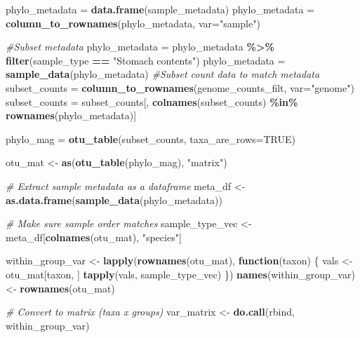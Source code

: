 \documentclass[
]{book}
\newenvironment{Shaded}{\begin{snugshade}}{\end{snugshade}}
\newcommand{\AttributeTok}[1]{\textcolor[rgb]{0.13,0.29,0.53}{#1}}
\newcommand{\CommentTok}[1]{\textcolor[rgb]{0.56,0.35,0.01}{\textit{#1}}}
\newcommand{\ConstantTok}[1]{\textcolor[rgb]{0.56,0.35,0.01}{#1}}
\newcommand{\ControlFlowTok}[1]{\textcolor[rgb]{0.13,0.29,0.53}{\textbf{#1}}}
\newcommand{\FunctionTok}[1]{\textcolor[rgb]{0.13,0.29,0.53}{\textbf{#1}}}
\newcommand{\NormalTok}[1]{#1}
\newcommand{\OtherTok}[1]{\textcolor[rgb]{0.56,0.35,0.01}{#1}}
\newcommand{\SpecialCharTok}[1]{\textcolor[rgb]{0.81,0.36,0.00}{\textbf{#1}}}
\newcommand{\StringTok}[1]{\textcolor[rgb]{0.31,0.60,0.02}{#1}}
\begin{document}
\begin{Shaded}
\begin{Highlighting}[]
\NormalTok{phylo\_metadata }\OtherTok{=} \FunctionTok{data.frame}\NormalTok{(sample\_metadata)}
\NormalTok{phylo\_metadata }\OtherTok{=} \FunctionTok{column\_to\_rownames}\NormalTok{(phylo\_metadata, }\AttributeTok{var=}\StringTok{"sample"}\NormalTok{)}

\CommentTok{\#Subset metadata}
\NormalTok{phylo\_metadata }\OtherTok{=}\NormalTok{ phylo\_metadata }\SpecialCharTok{\%\textgreater{}\%} \FunctionTok{filter}\NormalTok{(sample\_type }\SpecialCharTok{==} \StringTok{"Stomach contents"}\NormalTok{)}
\NormalTok{phylo\_metadata }\OtherTok{=} \FunctionTok{sample\_data}\NormalTok{(phylo\_metadata)}
\CommentTok{\#Subset count data to match metadata}
\NormalTok{subset\_counts }\OtherTok{=} \FunctionTok{column\_to\_rownames}\NormalTok{(genome\_counts\_filt, }\AttributeTok{var=}\StringTok{"genome"}\NormalTok{)}
\NormalTok{subset\_counts }\OtherTok{=}\NormalTok{ subset\_counts[, }\FunctionTok{colnames}\NormalTok{(subset\_counts) }\SpecialCharTok{\%in\%} \FunctionTok{rownames}\NormalTok{(phylo\_metadata)]}

\NormalTok{phylo\_mag }\OtherTok{=} \FunctionTok{otu\_table}\NormalTok{(subset\_counts, }\AttributeTok{taxa\_are\_rows=}\ConstantTok{TRUE}\NormalTok{)}

\NormalTok{otu\_mat }\OtherTok{\textless{}{-}} \FunctionTok{as}\NormalTok{(}\FunctionTok{otu\_table}\NormalTok{(phylo\_mag), }\StringTok{"matrix"}\NormalTok{)}

\CommentTok{\# Extract sample metadata as a dataframe}
\NormalTok{meta\_df }\OtherTok{\textless{}{-}} \FunctionTok{as.data.frame}\NormalTok{(}\FunctionTok{sample\_data}\NormalTok{(phylo\_metadata))}

\CommentTok{\# Make sure sample order matches}
\NormalTok{sample\_type\_vec }\OtherTok{\textless{}{-}}\NormalTok{ meta\_df[}\FunctionTok{colnames}\NormalTok{(otu\_mat), }\StringTok{"species"}\NormalTok{]}

\NormalTok{within\_group\_var }\OtherTok{\textless{}{-}} \FunctionTok{lapply}\NormalTok{(}\FunctionTok{rownames}\NormalTok{(otu\_mat), }\ControlFlowTok{function}\NormalTok{(taxon) \{}
\NormalTok{  vals }\OtherTok{\textless{}{-}}\NormalTok{ otu\_mat[taxon, ]}
  \FunctionTok{tapply}\NormalTok{(vals, sample\_type\_vec)}
\NormalTok{\})}
\FunctionTok{names}\NormalTok{(within\_group\_var) }\OtherTok{\textless{}{-}} \FunctionTok{rownames}\NormalTok{(otu\_mat)}

\CommentTok{\# Convert to matrix (taxa x groups)}
\NormalTok{var\_matrix }\OtherTok{\textless{}{-}} \FunctionTok{do.call}\NormalTok{(rbind, within\_group\_var)}


\end{Highlighting}
\end{Shaded}
\end{document}
